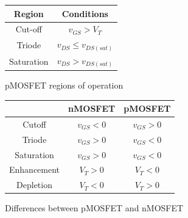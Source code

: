 \documentclass[nobib]{tufte-handout}
\begin{document}
\begin{figure}
    \begin{center}
        \begin{tabular}{ c | c }
            Region & Conditions \\
            \hline
            Cut-off & $v_{GS} > V_T$ \\
            Triode & $v_{DS} \leq v_{DS(sat)}$\\
            Saturation & $v_{DS} > v_{DS(sat)}$\\
            \hline
        \end{tabular}
    \end{center}
    \caption{pMOSFET regions of operation}
    \label{tab:pMOSFET regions}
\end{figure}

\begin{figure}
    \begin{center}
        \begin{tabular}{ c | c | c }
            & nMOSFET & pMOSFET \\
            \hline
            Cutoff & $v_{GS} < 0$ & $v_{GS} > 0$ \\
            Triode & $v_{GS} > 0$ & $v_{GS} < 0$ \\
            Saturation & $v_{GS} > 0$ & $v_{GS} < 0$ \\
            \hline
            Enhancement & $V_T > 0$ & $V_T < 0$ \\
            Depletion & $V_T < 0$ & $V_T > 0$ \\
            \hline
        \end{tabular}
    \end{center}
    \caption{Differences between pMOSFET and nMOSFET}
    \label{tab:pn differences}
\end{figure}
\end{document}

